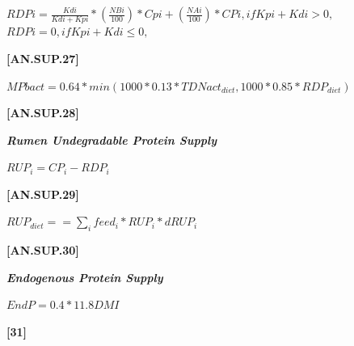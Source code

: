\documentclass{article}
\begin{document}
\begin{refsection}
    \begin{center}
    \(RDPi = \frac{Kdi}{Kdi + Kpi} * (\frac{NBi}{100}) * Cpi + (\frac{NAi}{100}) * CPi, if Kpi + Kdi > 0,\)
    \(RDPi = 0, if Kpi + Kdi \leq 0,\)
    \end{center}
    \vspace{0.5cm}
    
            {\raggedleft \textbf{[AN.SUP.27]}\par}
            \vspace{0.5cm}

    \begin{center}
    \(MPbact = 0.64 * min(1000 * 0.13 * TDNact_{diet}, 1000 * 0.85 * RDP_{diet})\)
    \end{center}
    \vspace{0.5cm}
    
            {\raggedleft \textbf{[AN.SUP.28]}\par}
            \vspace{0.5cm}

    \textbf{\textit{Rumen Undegradable Protein Supply}} 
    \vspace{0.25cm}

    \begin{center}
    \(RUP_{i} = CP_{i} - RDP_{i}\)
    \end{center}
    \vspace{0.5cm}
    
            {\raggedleft \textbf{[AN.SUP.29]}\par}
            \vspace{0.5cm}

    \begin{center}
    \(RUP_{diet} = = \sum_{i} feed_{i} * RUP_{i} * dRUP_{i}\)
    \end{center}
    \vspace{0.5cm}
    
            {\raggedleft \textbf{[AN.SUP.30]}\par}
            \vspace{0.5cm}

    \textbf{\textit{Endogenous Protein Supply}} 
    \vspace{0.25cm}

    \begin{center}
    \(EndP = 0.4 * 11.8 DMI\)
    \end{center}
    \vspace{0.5cm}
    
            {\raggedleft \textbf{[31]}\par}
            \vspace{0.5cm}


\end{refsection}
\end{document}
